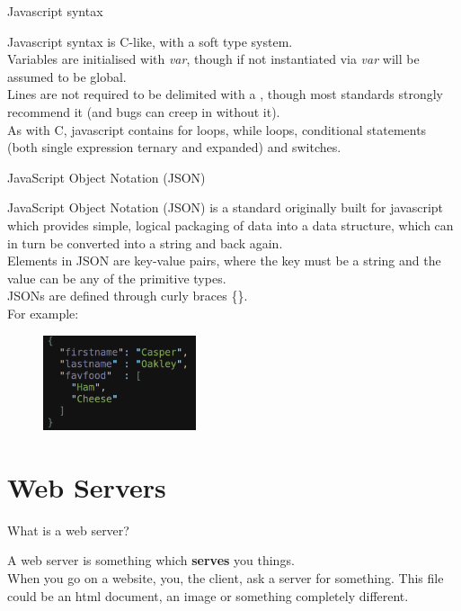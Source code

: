 \documentclass{beamer}
\begin{document}
\begin{frame}{Javascript syntax}

Javascript syntax is C-like, with a soft type system.\\
\pause
Variables are initialised with \textit{var}, though if not instantiated via \textit{var} will be assumed to be global.\\
\pause
Lines are not required to be delimited with a \textit{\;}, though most standards strongly recommend it (and bugs can creep in without it).\\
\pause
As with C, javascript contains for loops, while loops, conditional statements (both single expression ternary and expanded) and switches.

\end{frame}

\begin{frame}{JavaScript Object Notation (JSON)}

JavaScript Object Notation (JSON) is a standard originally built for javascript which provides simple, logical packaging of data into a data structure, which can in turn be converted into a string and back again.\\
\pause
Elements in JSON are key-value pairs, where the key must be a string and the value can be any of the primitive types.\\
\pause
JSONs are defined through curly braces \{\}.\\
\pause
For example:
\begin{figure}[h]
\includegraphics[width=0.4\textwidth]{json}
\end{figure}

\end{frame}


\section{Web Servers}

\begin{frame}{What is a web server?}

\pause
A web server is \pause something which \textbf{serves} you things. \pause \\

When you go on a website, you, the client, ask a server for something.\pause
This file could be an html document, an image or something completely different.

\end{frame}
\end{document}
